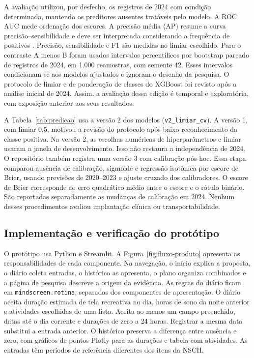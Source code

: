﻿\documentclass[12pt]{article}
\begin{document}
A avaliação utilizou, por desfecho, os registros de 2024 com condição determinada, mantendo os preditores ausentes tratáveis pelo modelo. A ROC AUC mede ordenação dos escores. A precisão média (AP) resume a curva precisão--sensibilidade e deve ser interpretada considerando a frequência de positivos \cite{saito2015}. Precisão, sensibilidade e F1 são medidas no limiar escolhido. Para o contraste A menos B foram usados intervalos percentílicos por bootstrap pareado de registros de 2024, em 1.000 reamostras, com semente 42. Esses intervalos condicionam-se aos modelos ajustados e ignoram o desenho da pesquisa. O protocolo de limiar e de ponderação de classes do XGBoost foi revisto após a análise inicial de 2024. Assim, a avaliação dessa edição é temporal e exploratória, com exposição anterior aos seus resultados.

A Tabela~\ref{tab:predicao} usa a versão 2 dos modelos (\texttt{v2\_limiar\_cv}). A versão 1, com limiar 0,5, motivou a revisão do protocolo após baixo reconhecimento da classe positiva. Na versão 2, as escolhas numéricas de hiperparâmetros e limiar usaram a janela de desenvolvimento. Isso não restaura a independência de 2024. O repositório também registra uma versão 3 com calibração pós-hoc. Essa etapa comparou ausência de calibração, sigmoide e regressão isotônica por escore de Brier, usando previsões de 2020--2023 e ajuste cruzado dos calibradores. O escore de Brier corresponde ao erro quadrático médio entre o escore e o rótulo binário. São reportadas separadamente as mudanças de calibração em 2024. Nenhum desses procedimentos avaliou implantação clínica ou transportabilidade.

\subsection{Implementação e verificação do protótipo}
O protótipo usa Python e Streamlit. A Figura~\ref{fig:fluxo-produto} apresenta as responsabilidades de cada componente. Na navegação, o início explica a proposta, o diário coleta entradas, o histórico as apresenta, o plano organiza combinados e a página de pesquisa descreve a origem da evidência. As regras do diário ficam em \texttt{mindscreen.rotina}, separadas dos componentes de apresentação. O diário aceita duração estimada de tela recreativa no dia, horas de sono da noite anterior e atividades escolhidas de uma lista. Aceita ao menos um campo preenchido, datas até o dia corrente e durações de zero a 24 horas. Registrar a mesma data substitui a entrada anterior. O histórico preserva a diferença entre ausência e zero, com gráficos de pontos Plotly para as durações e tabela com atividades. As entradas têm períodos de referência diferentes dos itens da NSCH.
\end{document}
